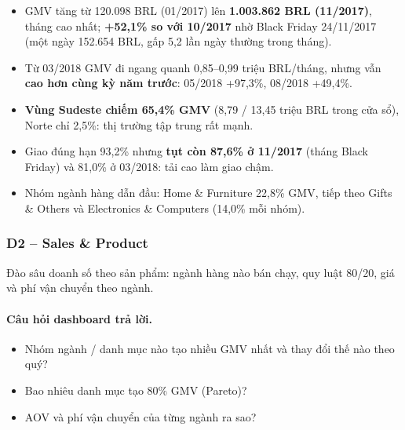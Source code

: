 \begin{itemize}
  \item GMV tăng từ 120.098 BRL (01/2017) lên \textbf{1.003.862 BRL (11/2017)}, tháng cao nhất; \textbf{+52,1\% so với 10/2017} nhờ Black Friday 24/11/2017 (một ngày 152.654 BRL, gấp 5,2 lần ngày thường trong tháng).
  \item Từ 03/2018 GMV đi ngang quanh 0,85–0,99 triệu BRL/tháng, nhưng vẫn \textbf{cao hơn cùng kỳ năm trước}: 05/2018 +97,3\%, 08/2018 +49,4\%.
  \item \textbf{Vùng Sudeste chiếm 65,4\% GMV} (8,79 / 13,45 triệu BRL trong cửa sổ), Norte chỉ 2,5\%: thị trường tập trung rất mạnh.
  \item Giao đúng hạn 93,2\% nhưng \textbf{tụt còn 87,6\% ở 11/2017} (tháng Black Friday) và 81,0\% ở 03/2018: tải cao làm giao chậm.
  \item Nhóm ngành hàng dẫn đầu: Home \& Furniture 22,8\% GMV, tiếp theo Gifts \& Others và Electronics \& Computers (14,0\% mỗi nhóm).
\end{itemize}

\subsubsection*{D2 – Sales \& Product}

Đào sâu doanh số theo sản phẩm: ngành hàng nào bán chạy, quy luật 80/20, giá và phí vận chuyển theo ngành.

\paragraph{Câu hỏi dashboard trả lời.}

\begin{itemize}
  \item Nhóm ngành / danh mục nào tạo nhiều GMV nhất và thay đổi thế nào theo quý?
  \item Bao nhiêu danh mục tạo 80\% GMV (Pareto)?
  \item AOV và phí vận chuyển của từng ngành ra sao?
\end{itemize}



